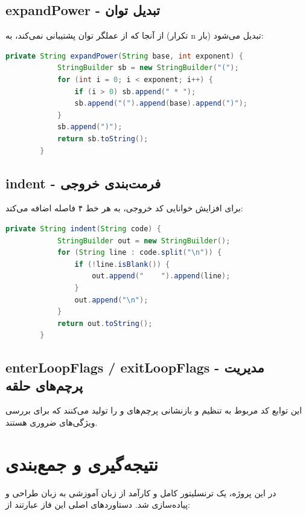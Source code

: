 \documentclass[12pt]{report}
\begin{document}
	\section{expandPower - تبدیل توان}
	
	از آنجا که  از عملگر توان پشتیبانی نمی‌کند،  به  (تکرار n بار) تبدیل می‌شود:
	
	\setLTR
	\begin{lstlisting}[language=Java]
		private String expandPower(String base, int exponent) {
			StringBuilder sb = new StringBuilder("(");
			for (int i = 0; i < exponent; i++) {
				if (i > 0) sb.append(" * ");
				sb.append("(").append(base).append(")");
			}
			sb.append(")");
			return sb.toString();
		}
	\end{lstlisting}
	\setRTL
	
	\section{indent - فرمت‌بندی خروجی}
	
	برای افزایش خوانایی کد خروجی، به هر خط ۴ فاصله اضافه می‌کند:
	\setLTR
	\begin{lstlisting}[language=Java]
		private String indent(String code) {
			StringBuilder out = new StringBuilder();
			for (String line : code.split("\n")) {
				if (!line.isBlank()) {
					out.append("    ").append(line);
				}
				out.append("\n");
			}
			return out.toString();
		}
	\end{lstlisting}
	\setRTL
	
	\section{enterLoopFlags / exitLoopFlags - مدیریت پرچم‌های حلقه}
	
	این توابع کد مربوط به تنظیم و بازنشانی پرچم‌های  و  را تولید می‌کنند که برای بررسی ویژگی‌های  ضروری هستند.
	
	
	
	\chapter{نتیجه‌گیری و جمع‌بندی}
	
	در این پروژه، یک ترنسلیتور کامل و کارآمد از زبان آموزشی  به زبان  طراحی و پیاده‌سازی شد. دستاوردهای اصلی این فاز عبارتند از:
	
\end{document}

